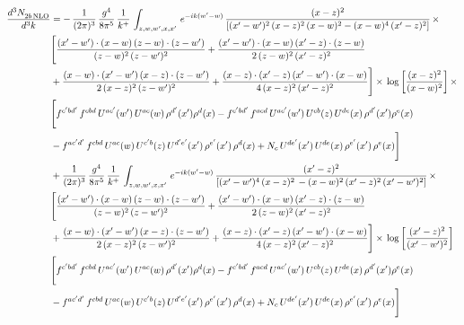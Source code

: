 \documentclass[9pt]{article}
\numberwithin{equation}{section}
\begin{document}
\begin{align}
    \frac{d^{3}N_{2b\,\rm NLO}^{\rm}}{d^{3}k}  & =  -\, \frac{1}{(2\pi)^{3}}\, \frac{g^{4}}{8\pi^{5}}\,\frac{1}{k^{+}}\,\int_{z,w,w^{\prime},x,x'}\, e^{-ik(w^{\prime}-w)}\, \frac{(x-z)^{2}}{\left[(x'-w')^{2}\,(x-z)^{2}\,(x-w)^{2} - (x-w)^{4}\, (x'-z)^{2}\right]}\,  \times\notag \\ & \Bigg[\frac{(x'-w')\cdot (x-w)\, (z-w)\cdot (z-w')}{(z-w)^{2}\, (z-w')^{2}}+\frac{(x'-w')\cdot (x-w)\, (x'-z)\cdot (z-w)}{2\, (z-w)^{2}\, (x'-z)^{2}}\notag \\ & +\frac{(x-w)\cdot (x'-w')\, (x-z)\cdot (z-w')}{2\, (x-z)^{2}\, (z-w')^{2}}+\frac{(x-z)\cdot (x'-z)\, (x'-w')\cdot (x-w)}{4\, (x-z)^{2}\, (x'-z)^{2}}\Bigg] \times\,\log{\left[\frac{(x-z)^{2}}{(x-w)^{2}}\right]}\,\times \notag \\ & \Bigg[f^{c'bd'}\,f^{cbd}\, U^{ac'}(w')\,U^{ac}(w)\,\rho^{d'}(x')\rho^{d}(x)- f^{c'bd'}\,f^{acd}\,U^{ac'}(w')\,U^{cb}(z)\,U^{de}(x)\,\rho^{d'}(x')\rho^{e}(x) \notag \\ & -f^{ac'd'}\,f^{cbd}\,U^{ac}(w)\,U^{c'b}(z)\,U^{d'e'}(x')\,\rho^{e'}(x')\,\rho^{d}(x) +N_{c}\,U^{de'}(x')\,U^{de}(x)\,\rho^{e'}(x')\,\rho^{e}(x)\Bigg] \notag \\
&  + \frac{1}{(2\pi)^{3}}\, \frac{g^{4}}{8\pi^{5}}\,\frac{1}{k^{+}}\,\int_{z,w,w^{\prime},x,x'}\, e^{-ik(w^{\prime}-w)}\, \frac{(x'-z)^{2}}{\left[(x'-w')^{4}\,(x-z)^{2}\, - (x-w)^{2}\, (x'-z)^{2}\,(x'-w')^{2}\right]}\,  \times\notag \\ & \Bigg[\frac{(x'-w')\cdot (x-w)\, (z-w)\cdot (z-w')}{(z-w)^{2}\, (z-w')^{2}}+\frac{(x'-w')\cdot (x-w)\, (x'-z)\cdot (z-w)}{2\, (z-w)^{2}\, (x'-z)^{2}}\notag \\ & +\frac{(x-w)\cdot (x'-w')\, (x-z)\cdot (z-w')}{2\, (x-z)^{2}\, (z-w')^{2}}+\frac{(x-z)\cdot (x'-z)\, (x'-w')\cdot (x-w)}{4\, (x-z)^{2}\, (x'-z)^{2}}\Bigg] \times\,\log{\left[\frac{(x'-z)^{2}}{(x'-w')^{2}}\right]} \notag \\ & \Bigg[f^{c'bd'}\,f^{cbd}\, U^{ac'}(w')\,U^{ac}(w)\,\rho^{d'}(x')\rho^{d}(x)- f^{c'bd'}\,f^{acd}\,U^{ac'}(w')\,U^{cb}(z)\,U^{de}(x)\,\rho^{d'}(x')\rho^{e}(x) \notag \\ & -f^{ac'd'}\,f^{cbd}\,U^{ac}(w)\,U^{c'b}(z)\,U^{d'e'}(x')\,\rho^{e'}(x')\,\rho^{d}(x) +N_{c}\,U^{de'}(x')\,U^{de}(x)\,\rho^{e'}(x')\,\rho^{e}(x)\Bigg]
\end{align}
\end{document}
